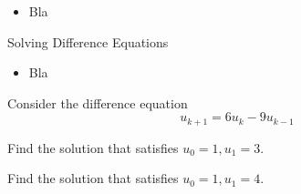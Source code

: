 \begin{lesson}

	\begin{itemize}
		\item Bla
	\end{itemize}
	

\end{lesson}


%
%
%
%
%
%
%
%











%
%



\begin{module}{Solving Difference Equations}
	\label{diff:solve}

	
	
\end{module}



\begin{lesson}

	\begin{itemize}
		\item Bla
	\end{itemize}
	

\end{lesson}





\question	
	Consider the difference equation
	$$	u_{k+1} = 6 u_k - 9u_{k-1}	$$
	
\begin{parts}
	\item Find the solution that satisfies $u_0 = 1, u_1 = 3	$.
	\item Find the solution that satisfies $u_0 = 1, u_1 = 4$.
\end{parts}



